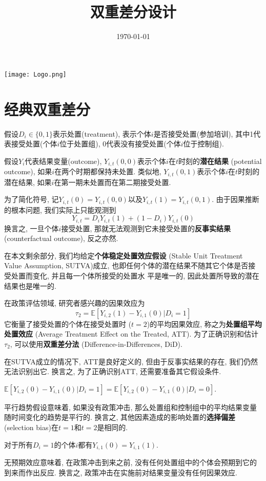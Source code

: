 \documentclass[cn,blue,14pt,screen,bibstyle=gb7714-2015]{elegantnote}
\title{双重差分设计}
\date{\today}
\newcommand{\E}{\mathbb{E}}
\begin{document}
\maketitle

\centerline{
  \texttt{[image: Logo.png]}
}



\section{经典双重差分}

假设$D_i\in \{0,1\}$表示处置(treatment), 表示个体$i$是否接受处置(参加培训), 其中1代表接受处置(个体$i$位于处置组), 0代表没有接受处置(个体$i$位于控制组).


假设$Y_i$代表结果变量(outcome), $Y_{i,t}(0,0)$表示个体$i$在$t$时刻的\textbf{潜在结果} (potential outcome), 如果$i$在两个时期都保持未处置. 类似地, $Y_{i,t}(0,1)$表示个体$i$在$t$时刻的潜在结果, 如果$i$在第一期未处置而在第二期接受处置.

为了简化符号, 记$Y_{i,t}(0)=Y_{i,t}(0,0)$以及$Y_{i,t}(1)=Y_{i,t}(0,1)$. 由于因果推断的根本问题, 我们实际上只能观测到
$$Y_{i,t}=D_iY_{i,t}(1)+(1-D_i)Y_{i,t}(0)$$
换言之, 一旦个体$i$接受处置, 那就无法观测到它未接受处置的\textbf{反事实结果} (counterfactual outcome), 反之亦然.

在本文剩余部分, 我们均给定\textbf{个体稳定处置效应假设} (Stable Unit Treatment Value Assumption, SUTVA)成立, 也即任何个体的潜在结果不随其它个体是否接受处置而变化, 并且每一个体所接受的处置水 平是唯一的, 因此处置所导致的潜在结果也是唯一的.

在政策评估领域, 研究者感兴趣的因果效应为
$$\tau_2=\E[Y_{i,2}(1)-Y_{i,1}(0)|D_i=1]$$
它衡量了接受处置的个体在接受处置时 ($t=2$)的平均因果效应, 称之为\textbf{处置组平均处置效应} (Average Treatment Effect on the Treated, ATT). 为了正确识别和估计$\tau_2$, 可以使用\textbf{双重差分法} (Difference-in-Differences, DiD).

在SUTVA成立的情况下, ATT是良好定义的, 但由于反事实结果的存在, 我们仍然无法识别出它. 换言之, 为了正确识别ATT, 还需要准备其它假设条件.

\begin{definition}[平行趋势]
  $\E[Y_{i,2}(0)-Y_{i,1}(0)|D_i=1]=\E[Y_{i,2}(0)-Y_{i,1}(0)|D_i=0]$.
\end{definition}
平行趋势假设意味着, 如果没有政策冲击, 那么处置组和控制组中的平均结果变量随时间变化的趋势是平行的. 换言之, 其他因素造成的影响处置的\textbf{选择偏差} (selection bias)在$t=1$和$t=2$是相同的.

\begin{definition}[无预期效应]
对于所有$D_i=1$的个体$i$都有$Y_{i,1}(0)=Y_{i,1}(1)$.
\end{definition}
无预期效应意味着, 在政策冲击到来之前, 没有任何处置组中的个体会预期到它的到来而作出反应. 换言之, 政策冲击在实施前对结果变量没有任何因果效应.
\end{document}
